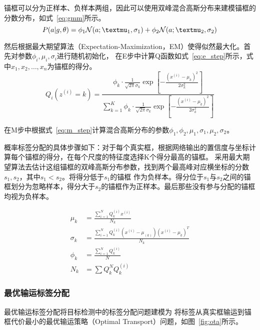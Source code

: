 锚框可以分为正样本、负样本两组，因此可以使用双峰混合高斯分布来建模锚框的分数分布，如式~\ref{eq:gmm}所示。
\begin{equation}   
  P(a|g,\theta ) = {\phi _1}{\cal N}(a;{\mu _1},{\sigma _1}) + {\phi _2}{\cal N}(a;{\mu _2},{\sigma _2})
  \label{eq:gmm} 
\end{equation}

然后根据最大期望算法（Expectation-Maximization，EM）使得似然最大化。首先对参数$\phi_i, \mu_i, \sigma_i$进行随机初始化，
在E步中计算Q函数如式~\ref{eq:e_step}所示，式中$x_{1}, x_{2}, \ldots, x_{n}$为锚框的得分。
\begin{equation}   
  Q_{i}\left(z^{(i)}=k\right)=\frac{\phi_{k} \cdot \frac{1}{\sqrt{2 \pi} \sigma_{k}} \exp \left[-\frac{\left(x^{(i)}-\mu_{k}\right)^{2}}{2 \sigma_{k}^{2}}\right]}{\sum_{k=1}^{K} \phi_{k} \cdot \frac{1}{\sqrt{2 \pi} \sigma_{k}} \exp \left[-\frac{\left(x^{(i)}-\mu_{k}\right)^{2}}{2 \sigma_{k}^{2}}\right]}
  \label{eq:e_step} 
\end{equation}

在M步中根据式~\ref{eq:m_step}计算混合高斯分布的参数$\phi_1,\phi_2,\mu_1,\sigma_1,\mu_2,\sigma_2$。

概率标签分配的具体步骤如下：对于每个真实框，根据网络输出的置信度与坐标计算每个锚框的得分，在每个尺度的特征度选择K个得分最高的锚框。
采用最大期望算法去估计这组锚框的双峰高斯分布参数，找到两个最高峰对应横坐标的分数$s_1,s_2$，其中$s_1 < s_2$。将得分低于$s_1$的锚框
作为负样本。得分位于$s_1$与$s_2$之间的锚框划分为忽略样本，得分大于$s_2$的锚框作为正样本。最后那些没有参与分配的锚框均视为负样本。

\begin{equation}   
  \begin{aligned} \mu_{k} & =\frac{\sum_{i=1}^{N} Q_{k}^{(i)} x^{(i)}}{N_{k}} \\ 
    \sigma_{k} & =\frac{\sum_{i=1}^{N} Q_{k}^{(i)}\left(x^{(i)}-\mu_{(k)}\right)\left(x^{(i)}-\mu_{k}\right)^{T}}{N_{k}} \\ 
    \phi_{k} & =\frac{\sum_{i=1}^{N} Q_{k}^{(i)}}{N} \\ 
    N_{k} & =\sum Q_{k}^{N} Q_{k}^{(i)} 
  \end{aligned}
  \label{eq:m_step} 
\end{equation}
\subsubsection{最优输运标签分配}
最优输运\cite{villani2009optimal}标签分配将目标检测中的标签分配问题建模为
将标签从真实框输运到锚框代价最小的最优输运策略（Optimal Transport）问题，如图~\ref{fig:ota}所示。

